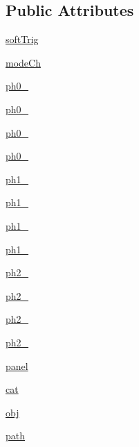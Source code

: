 \subsection*{Public Attributes}
\begin{DoxyCompactItemize}
\item 
\hyperlink{classProtoFEB__v1_1_1ProtoFEB__v1_a3ea716a290c9ca4fd5b1bb04f41b69c5}{softTrig}
\item 
\hyperlink{classProtoFEB__v1_1_1ProtoFEB__v1_aaf44fb26138bd663c8d7faee3b2e94bf}{modeCh}
\item 
\hyperlink{classProtoFEB__v1_1_1ProtoFEB__v1_a3cacbf244b4e3c06f138935dbce907b7}{ph0\_}
\item 
\hyperlink{classProtoFEB__v1_1_1ProtoFEB__v1_a734eb72a6fdd8b7907a268f9f3300795}{ph0\_}
\item 
\hyperlink{classProtoFEB__v1_1_1ProtoFEB__v1_a7180d040b69112c1d66779746dc58cea}{ph0\_}
\item 
\hyperlink{classProtoFEB__v1_1_1ProtoFEB__v1_a32cbcba33b394ed14c79f0c0fe60c479}{ph0\_}
\item 
\hyperlink{classProtoFEB__v1_1_1ProtoFEB__v1_a615802862be61ed61f35f83d698db9ef}{ph1\_}
\item 
\hyperlink{classProtoFEB__v1_1_1ProtoFEB__v1_a7cffc575fe705a474fa5f26e534e8a15}{ph1\_}
\item 
\hyperlink{classProtoFEB__v1_1_1ProtoFEB__v1_a6cec15a7d2244084d67bd057bc98fffe}{ph1\_}
\item 
\hyperlink{classProtoFEB__v1_1_1ProtoFEB__v1_a275c8b8ad2c4004bd709d182a09a0ab7}{ph1\_}
\item 
\hyperlink{classProtoFEB__v1_1_1ProtoFEB__v1_a08a4b28a7f05dcf80bd92cde887d1d12}{ph2\_}
\item 
\hyperlink{classProtoFEB__v1_1_1ProtoFEB__v1_ae3d8ead16d02484a80dd99465f93ce2e}{ph2\_}
\item 
\hyperlink{classProtoFEB__v1_1_1ProtoFEB__v1_a52cb09809a670c1c643f8421d31cda5e}{ph2\_}
\item 
\hyperlink{classProtoFEB__v1_1_1ProtoFEB__v1_a1985e6c1191761622cee61f3987e23d4}{ph2\_}
\item 
\hyperlink{classelement_1_1element_abadf93bb1b1fa6f5fdd00dde996d0f2c}{panel}
\item 
\hyperlink{classobject_1_1object_a4fbaf843d1f40843b2c3895cb73ffada}{cat}
\item 
\hyperlink{classobject_1_1object_a15f13858ecdbf661a97a7da93d717922}{obj}
\item 
\hyperlink{classobject_1_1object_a6b4e1fd053496eafff2bc0f8aed7f089}{path}
\end{DoxyCompactItemize}



